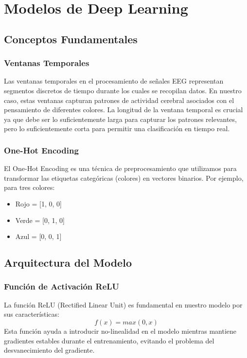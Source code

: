 \chapter{Modelos de Deep Learning}\label{ch:deep_learning_models}

\section{Conceptos Fundamentales}

\subsection{Ventanas Temporales}
Las ventanas temporales en el procesamiento de señales EEG representan segmentos discretos de tiempo durante los cuales se recopilan datos. En nuestro caso, estas ventanas capturan patrones de actividad cerebral asociados con el pensamiento de diferentes colores. La longitud de la ventana temporal es crucial ya que debe ser lo suficientemente larga para capturar los patrones relevantes, pero lo suficientemente corta para permitir una clasificación en tiempo real.

\subsection{One-Hot Encoding}
El One-Hot Encoding es una técnica de preprocesamiento que utilizamos para transformar las etiquetas categóricas (colores) en vectores binarios. Por ejemplo, para tres colores:
\begin{itemize}
    \item Rojo = [1, 0, 0]
    \item Verde = [0, 1, 0]
    \item Azul = [0, 0, 1]
\end{itemize}

\section{Arquitectura del Modelo}

\subsection{Función de Activación ReLU}
La función ReLU (Rectified Linear Unit) es fundamental en nuestro modelo por sus características:
\begin{equation}
    f(x) = max(0, x)
\end{equation}
Esta función ayuda a introducir no-linealidad en el modelo mientras mantiene gradientes estables durante el entrenamiento, evitando el problema del desvanecimiento del gradiente.

